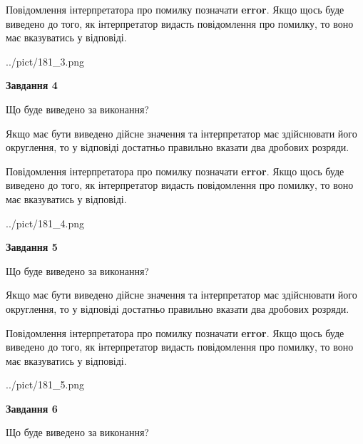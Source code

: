\documentclass[12pt, ukrainian]{article}
\begin{document}
{\begin {Large}
Повідомлення інтерпретатора про помилку позначати \textbf{error}.
Якщо щось буде виведено до того, як інтерпретатор видасть повідомлення про помилку, 
то воно має вказуватись у відповіді. \par

\begin{center}
	{../pict/181_3.png}
\end{center}
\newpage

{\begin {center}\textbf{Завдання 4}\end {center}}\par
Що буде виведено за виконання? \par

Якщо має бути виведено дійсне значення та інтерпретатор має здійснювати його округлення, 
то у відповіді достатньо правильно вказати два дробових розряди.

Повідомлення інтерпретатора про помилку позначати \textbf{error}.
Якщо щось буде виведено до того, як інтерпретатор видасть повідомлення про помилку, 
то воно має вказуватись у відповіді. \par

\begin{center}
	{../pict/181_4.png}
\end{center}
\newpage

{\begin {center}\textbf{Завдання 5}\end {center}}\par
Що буде виведено за виконання? \par

Якщо має бути виведено дійсне значення та інтерпретатор має здійснювати його округлення, 
то у відповіді достатньо правильно вказати два дробових розряди.

Повідомлення інтерпретатора про помилку позначати \textbf{error}.
Якщо щось буде виведено до того, як інтерпретатор видасть повідомлення про помилку, 
то воно має вказуватись у відповіді. \par

\begin{center}
	{../pict/181_5.png}
\end{center}
\newpage

{\begin {center}\textbf{Завдання 6}\end {center}}\par
Що буде виведено за виконання? \par


\end{Large}}
\end{document}
